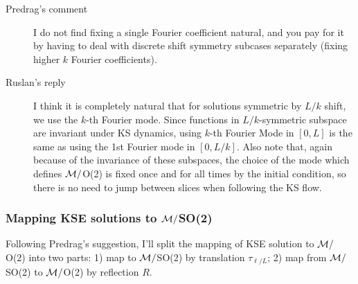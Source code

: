 \begin{description}
\item[Predrag's comment] I do not find fixing a single
Fourier coefficient natural, and you pay for it by having to
deal with discrete shift symmetry subcases separately (fixing
higher $k$ Fourier coefficients).
\item[Ruslan's reply] I think it is completely natural that
for solutions symmetric by $L/k$ shift, we use the $k$-th
Fourier mode. Since functions in $L/k$-symmetric subspace are
invariant under KS dynamics, using $k$-th Fourier Mode in
$[0, L]$ is the same as using the 1st Fourier mode in $[0,
L/k]$.  Also note that, again because of the invariance of
these subspaces, the choice of the mode which defines
${\cal M}/$O(2) is fixed once and for all times by the initial
condition, so there is no need to jump between slices when
following the KS flow.
\end{description}

\subsubsection{Mapping KSE solutions to ${\cal M}/$SO(2)}

Following Predrag's suggestion, I'll split the mapping of KSE solution to ${\cal M}/$O(2) into two parts: 1) map to ${\cal M}/$SO(2) by translation $\tau_{\ell/L}$; 2) map from ${\cal M}/$SO(2) to ${\cal M}/$O(2) by reflection $R$.

\medskip{}



%
%
%
%
%
%
%
%
%
%
%
%
%
%
%
%
%
%
%

